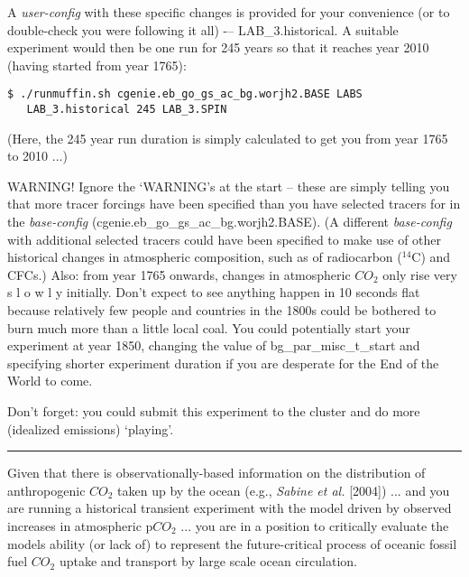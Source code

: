 \documentclass[11pt,fleqn]{book} %
\begin{document}
A \textit{user-config} with these specific changes is provided for your convenience (or to double-check you were following it all) -– \footnotesize\textsf{LAB\_3.historical}\normalsize. A suitable experiment would then be one run for 245 years so that it reaches year 2010 (having started from year 1765):
\vspace{-2pt}\begin{verbatim}
$ ./runmuffin.sh cgenie.eb_go_gs_ac_bg.worjh2.BASE LABS
   LAB_3.historical 245 LAB_3.SPIN
\end{verbatim}\vspace{-2pt}
(Here, the 245 year run duration is simply calculated to get you from year 1765 to 2010 ...)

WARNING! Ignore the ‘WARNING’s at the start -- these are simply telling you that more tracer forcings have been specified than you have selected tracers for in the \textit{base-config} (cgenie.eb\_go\_gs\_ac\_bg.worjh2.BASE). (A different \textit{base-config} with additional selected tracers could have been specified to make use of other historical changes in atmospheric composition, such as of radiocarbon ($^{14}$C) and CFCs.) Also: from year 1765 onwards, changes in atmospheric \(CO_{2}\) only rise very s l o w l y initially. Don’t expect to see anything happen in 10 seconds flat because relatively few people and countries in the 1800s could be bothered to burn much more than a little local coal. You could potentially start your experiment at year 1850, changing the value of bg\_par\_misc\_t\_start and specifying shorter experiment duration if you are desperate for the End of the World to come.

Don’t forget: you could submit this experiment to the cluster and do more (idealized emissions) ‘playing’.

\vspace{1mm}
\noindent\rule{4cm}{0.1mm}
\vspace{2mm}

\noindent Given that there is observationally-based information on the distribution of anthropogenic \(CO_{2}\) taken up by the ocean (e.g., \textit{Sabine et al.} [2004]) ... and you are running a historical transient experiment with the model driven by observed increases in atmospheric p\(CO_{2}\) ... you are in a position to critically evaluate the models ability (or lack of) to represent the future-critical process of oceanic fossil fuel \(CO_{2}\) uptake and transport by large scale ocean circulation.
\end{document}
